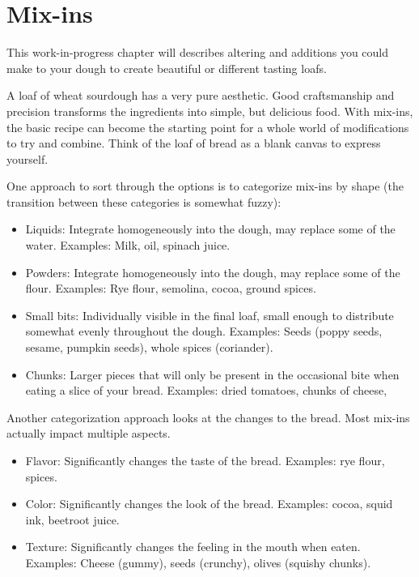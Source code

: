 \chapter{Mix-ins}%
\label{ch:mix-ins}
\begin{quoting}
    This work-in-progress chapter will describes altering and additions you
    could make to your dough to create beautiful or different tasting loafs.
\end{quoting}

A loaf of wheat sourdough has a very pure aesthetic. Good craftsmanship and
precision transforms the ingredients into simple, but delicious food. With
mix-ins, the basic recipe can become the starting point for a whole world of
modifications to try and combine. Think of the loaf of bread as a blank canvas
to express yourself.

One approach to sort through the options is to categorize mix-ins by shape
(the transition between these categories is somewhat fuzzy):
\begin{itemize}
  \item Liquids: Integrate homogeneously into the dough, may replace some of
      the water. Examples: Milk, oil, spinach juice.
  \item Powders: Integrate homogeneously into the dough, may replace some of
      the flour. Examples: Rye flour, semolina, cocoa, ground spices.
  \item Small bits: Individually visible in the final loaf, small enough to
      distribute somewhat evenly throughout the dough. Examples: Seeds (poppy
      seeds, sesame, pumpkin seeds), whole spices (coriander).
  \item Chunks: Larger pieces that will only be present in the occasional bite
      when eating a slice of your bread. Examples: dried tomatoes, chunks of
      cheese,
\end{itemize}

Another categorization approach looks at the changes to the bread. Most
mix-ins actually impact multiple aspects.
\begin{itemize}
  \item Flavor: Significantly changes the taste of the bread. Examples: rye
      flour, spices.
  \item Color: Significantly changes the look of the bread. Examples: cocoa,
      squid ink, beetroot juice.
  \item Texture: Significantly changes the feeling in the mouth when eaten.
      Examples: Cheese (gummy), seeds (crunchy), olives (squishy chunks).
\end{itemize}

